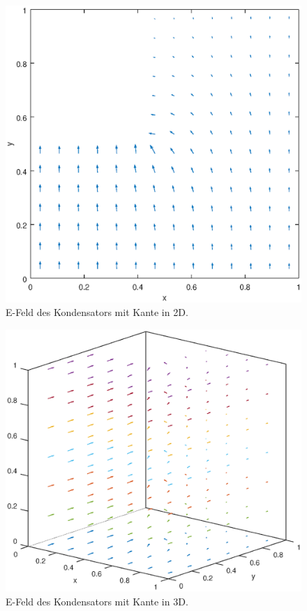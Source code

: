\documentclass[./Protokollheft.tex]{subfiles}
\begin{document}
\begin{figure}[hp]
\begin{center}
\includegraphics[scale=0.7]{eps/plotE2D}
\end{center}
\caption[E-Feld eines Kondensators mit Kante in 2D]{E-Feld des Kondensators mit Kante in 2D.}
\label{fig:V4.PA4.2}
\end{figure}

\begin{figure}[hp]
\begin{center}
\includegraphics[scale=0.7]{eps/plotE3D}
\end{center}
\caption[E-Feld eines Kondensators mit Kante in 3D]{E-Feld des Kondensators mit Kante in 3D.}
\label{fig:V4.PA4.3}
\end{figure}
\end{document}
